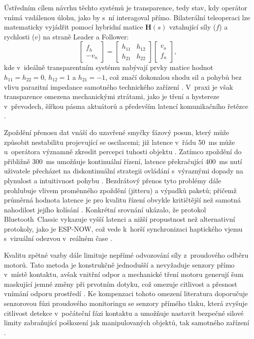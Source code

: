 Ústředním cílem návrhu těchto systémů je transparence, tedy stav, kdy operátor vnímá vzdálenou úlohu, jako by s~ní interagoval přímo.
Bilaterální teleoperaci lze matematicky vyjádřit pomocí hybridní matice $\mathbf{H}(s)$ vztahující síly ($f$) a rychlosti ($v$) na straně Leader a Follower:
%
\begin{equation}
    \begin{bmatrix} f_h \\ -v_n \end{bmatrix} =
    \begin{bmatrix} h_{11} & h_{12} \\ h_{21} & h_{22} \end{bmatrix}
    \begin{bmatrix} v_o \\ f_n \end{bmatrix},
\end{equation}
%
kde v~ideálně transparentním systému nabývají prvky matice hodnot $h_{11} = h_{22} = 0$, $h_{12} = 1$ a $h_{21} = -1$, což značí dokonalou shodu sil a pohybů bez vlivu parazitní impedance samotného technického zařízení \cite{Black2025, Almeida202098}.
V~praxi je však transparence omezena mechanickými ztrátami, jako je tření a hystereze v~převodech, šířkou pásma aktuátorů a především latencí komunikačního řetězce \cite{Patel2022, Black2025}.

Zpoždění přenosu dat vnáší do uzavřené smyčky fázový posun, který může způsobit nestabilitu projevující se oscilacemi; již latence v~řádu 50~ms může u~operátora významně zkreslit percepci tuhosti objektu \cite{Patel2022}.
Zatímco zpoždění do přibližně 300~ms umožňuje kontinuální řízení, latence překračující 400~ms nutí uživatele přecházet na diskontinuální strategii ovládání s~výraznými dopady na plynulost a intuitivnost pohybu \cite{Bolarinwa2022, Almeida202098}.
Bezdrátový přenos tyto problémy dále prohlubuje vlivem proměnného zpoždění (jitteru) a výpadků paketů; přičemž průměrná hodnota latence je pro kvalitu řízení obvykle kritičtější než samotná nahodilost jejího kolísání \cite{Suman2025, Almeida202098}.
Konkrétní srovnání ukázalo, že protokol Bluetooth~Classic vykazuje vyšší latenci a nižší propustnost než alternativní protokoly, jako je ESP-NOW, což vede k~horší synchronizaci haptického vjemu s~vizuální odezvou v~reálném čase \cite{Eridani2021918, Papakonstantinou20251218}.

Kvalitu zpětné vazby dále limituje nepřímé odvozování síly z~proudového odběru motorů.
Tato metoda je konstrukčně jednodušší a nevyžaduje senzory přímo v~místě kontaktu, avšak vnitřní odpor a mechanické tření motoru generují šum maskující jemné změny při prvotním dotyku, což omezuje citlivost a přesnost vnímání odporu prostředí \cite{Patel2022, Mohammadi2024418}.
Ke kompenzaci tohoto omezení literatura doporučuje senzorovou fúzi proudového monitoringu se senzory přímého tlaku, která zvyšuje citlivost detekce v~počáteční fázi kontaktu a umožňuje nastavit bezpečné silové limity zabraňující poškození jak manipulovaných objektů, tak samotného zařízení \cite{Lebosse2011, Mohammadi2024418}.
